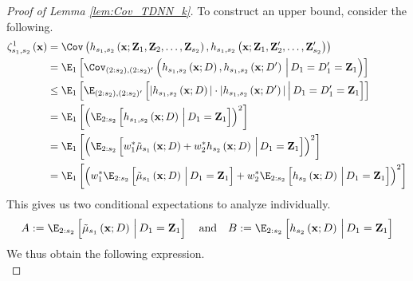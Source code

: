 \begin{proof}[Proof of Lemma \ref{lem:Cov_TDNN_k}]
	To construct an upper bound, consider the following.
	\begin{equation}
		\begin{aligned}
			\zeta_{s_1, s_2}^{1}\left(\mathbf{x}\right)
			 & = \Cov\left(
			h_{s_1, s_2}\left(\mathbf{x}; \mathbf{Z}_1, \mathbf{Z}_2, \ldots, \mathbf{Z}_{s_2}\right),
			h_{s_1, s_2}\left(\mathbf{x}; \mathbf{Z}_1, \mathbf{Z}_{2}^{\prime}, \ldots, \mathbf{Z}_{s_2}^{\prime}\right)
			\right)                                                  \\
			 & = \E_{1}\left[\Cov_{(2:s_2), (2:s_2)^{\prime}}\left(
				h_{s_1, s_2}\left(\mathbf{x}; D\right),
				h_{s_1, s_2}\left(\mathbf{x}; D^{\prime}\right)
				\, \Big| \, D_1 = D_{1}^{\prime} = \mathbf{Z}_1\right)
			\right]                                                  \\
			 & \leq \E_{1}\left[\E_{(2:s_2), (2:s_2)^{\prime}}\left[
			|h_{s_1, s_2}\left(\mathbf{x}; D\right)| \cdot
			|h_{s_1, s_2}\left(\mathbf{x}; D^{\prime}\right)|
			\, \Big| \, D_1 = D_{1}^{\prime} = \mathbf{Z}_1\right]
			\right]                                                  \\
			 & = \E_{1}\left[\left(\E_{2:s_2}\left[
					h_{s_1, s_2}\left(\mathbf{x}; D\right)
					\, \Big| \, D_1 = \mathbf{Z}_1\right]\right)^{2}
			\right]                                                  \\
			 & = \E_{1}\left[\left(\E_{2:s_2}\left[
					w_{1}^{*} \tilde{\mu}_{s_1}\left(\mathbf{x}; D\right) + w_{2}^{*} h_{s_2}\left(\mathbf{x}; D\right)
					\, \Big| \, D_1 = \mathbf{Z}_1\right]\right)^{2}
			\right]                                                  \\
			 & = \E_{1}\left[\left(
				w_{1}^{*} \E_{2:s_2}\left[\tilde{\mu}_{s_1}\left(\mathbf{x}; D\right)\, \Big| \, D_1 = \mathbf{Z}_1\right]
				+ w_{2}^{*} \E_{2:s_2}\left[h_{s_2}\left(\mathbf{x}; D\right)\, \Big| \, D_1 = \mathbf{Z}_1\right]
				\right)^{2}
				\right]
		\end{aligned}
	\end{equation}
	This gives us two conditional expectations to analyze individually.
	\begin{equation}
		A := \E_{2:s_2}\left[\tilde{\mu}_{s_1}\left(\mathbf{x}; D\right)\, \Big| \, D_1 = \mathbf{Z}_1\right]
		\quad \text{and} \quad
		B := \E_{2:s_2}\left[h_{s_2}\left(\mathbf{x}; D\right)\, \Big| \, D_1 = \mathbf{Z}_1\right]
	\end{equation}
	We thus obtain the following expression.
	\begin{equation}

\end{equation}
\end{proof}
